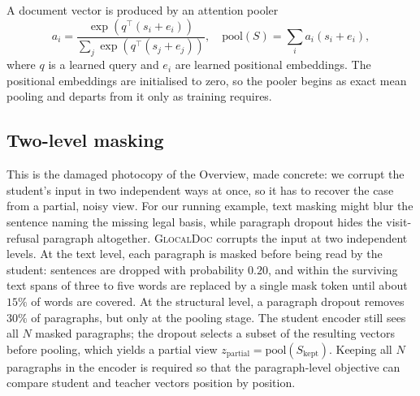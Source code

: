 \documentclass[conference]{IEEEtran}
\newcommand{\glocal}{\textsc{GlocalDoc}}
\begin{document}
A document vector is produced by an attention pooler
\begin{equation}
a_i = \frac{\exp(q^\top (s_i + e_i))}{\sum_{j} \exp(q^\top (s_j + e_j))}, \quad
\mathrm{pool}(S) = \sum_i a_i (s_i + e_i),
\end{equation}
where $q$ is a learned query and $e_i$ are learned positional embeddings. The
positional embeddings are initialised to zero, so the pooler begins as exact mean
pooling and departs from it only as training requires.

\subsection{Two-level masking}
This is the damaged photocopy of the Overview, made concrete: we corrupt the
student's input in two independent ways at once, so it has to recover the case from a
partial, noisy view. For our running example, text masking might blur the sentence
naming the missing legal basis, while paragraph dropout hides the visit-refusal
paragraph altogether. \glocal{} corrupts the input at two independent levels. At the
text level, each
paragraph is masked before being read by the student: sentences are dropped with
probability $0.20$, and within the surviving text spans of three to five words are
replaced by a single mask token until about $15\%$ of words are covered. At the
structural level, a paragraph dropout removes $30\%$ of paragraphs, but only at the
pooling stage. The student encoder still sees all $N$ masked paragraphs; the dropout
selects a subset of the resulting vectors before pooling, which yields a partial
view $z_{\mathrm{partial}} = \mathrm{pool}(S_{\mathrm{kept}})$. Keeping all $N$
paragraphs in the encoder is required so that the paragraph-level objective can
compare student and teacher vectors position by position.
\end{document}
